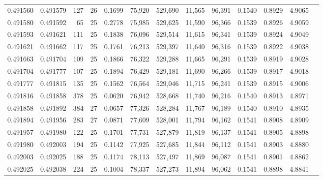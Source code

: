 \begin{tabular}{rrrrrrrrrrrrr}
0.491560 & 0.491579 & 127 &  26 &                                     0.1699 &  75,920 & 529,690 &  11,565 &  96,391 & 0.1540 & 0.8929 & 4.9065 \\
0.491580 & 0.491592 &  65 &  25 &                                     0.2778 &  75,985 & 529,625 &  11,590 &  96,366 & 0.1539 & 0.8926 & 4.9059 \\
0.491593 & 0.491621 & 111 &  25 &                                     0.1838 &  76,096 & 529,514 &  11,615 &  96,341 & 0.1539 & 0.8924 & 4.9049 \\
0.491621 & 0.491662 & 117 &  25 &                                     0.1761 &  76,213 & 529,397 &  11,640 &  96,316 & 0.1539 & 0.8922 & 4.9038 \\
0.491663 & 0.491704 & 109 &  25 &                                     0.1866 &  76,322 & 529,288 &  11,665 &  96,291 & 0.1539 & 0.8919 & 4.9028 \\
0.491704 & 0.491777 & 107 &  25 &                                     0.1894 &  76,429 & 529,181 &  11,690 &  96,266 & 0.1539 & 0.8917 & 4.9018 \\
0.491777 & 0.491815 & 135 &  25 &                                     0.1562 &  76,564 & 529,046 &  11,715 &  96,241 & 0.1539 & 0.8915 & 4.9006 \\
0.491816 & 0.491858 & 378 &  25 &                                     0.0620 &  76,942 & 528,668 &  11,740 &  96,216 & 0.1540 & 0.8913 & 4.8971 \\
0.491858 & 0.491892 & 384 &  27 &                                     0.0657 &  77,326 & 528,284 &  11,767 &  96,189 & 0.1540 & 0.8910 & 4.8935 \\
0.491894 & 0.491956 & 283 &  27 &                                     0.0871 &  77,609 & 528,001 &  11,794 &  96,162 & 0.1541 & 0.8908 & 4.8909 \\
0.491957 & 0.491980 & 122 &  25 &                                     0.1701 &  77,731 & 527,879 &  11,819 &  96,137 & 0.1541 & 0.8905 & 4.8898 \\
0.491980 & 0.492003 & 194 &  25 &                                     0.1142 &  77,925 & 527,685 &  11,844 &  96,112 & 0.1541 & 0.8903 & 4.8880 \\
0.492003 & 0.492025 & 188 &  25 &                                     0.1174 &  78,113 & 527,497 &  11,869 &  96,087 & 0.1541 & 0.8901 & 4.8862 \\
0.492025 & 0.492038 & 224 &  25 &                                     0.1004 &  78,337 & 527,273 &  11,894 &  96,062 & 0.1541 & 0.8898 & 4.8841 \\

\end{tabular}
